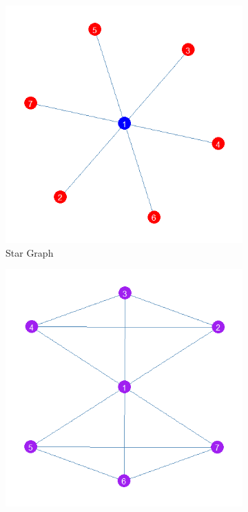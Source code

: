 \documentclass[12pt]{article}
\begin{document}
\begin{figure}
    \captionsetup[subfigure]{font=footnotesize,labelfont=footnotesize}
    \centering
     \begin{subfigure}[b]{0.45\textwidth}
        \includegraphics[width=1.0\textwidth]{Plots/star.png}
            \caption{Star Graph}
            \label{fig:star}
    \end{subfigure}
     \begin{subfigure}[b]{0.45\textwidth}
        \includegraphics[width=1.0\textwidth]{Plots/sf.png}

\end{subfigure}
\end{figure}
\end{document}
